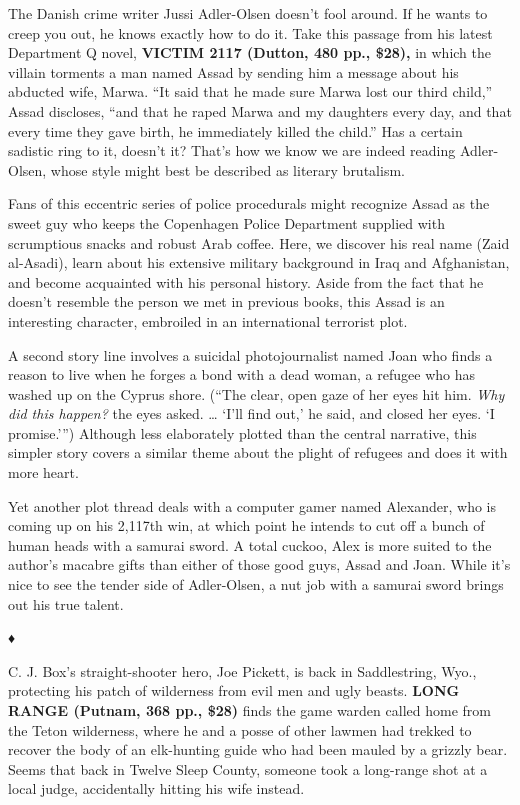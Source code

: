 The Danish crime writer Jussi Adler-Olsen doesn't fool around. If he
wants to creep you out, he knows exactly how to do it. Take this passage
from his latest Department Q novel, \textbf{VICTIM 2117 (Dutton, 480
pp., \$28),} in which the villain torments a man named Assad by sending
him a message about his abducted wife, Marwa. ``It said that he made
sure Marwa lost our third child,'' Assad discloses, ``and that he raped
Marwa and my daughters every day, and that every time they gave birth,
he immediately killed the child.'' Has a certain sadistic ring to it,
doesn't it? That's how we know we are indeed reading Adler-Olsen, whose
style might best be described as literary brutalism.

Fans of this eccentric series of police procedurals might recognize
Assad as the sweet guy who keeps the Copenhagen Police Department
supplied with scrumptious snacks and robust Arab coffee. Here, we
discover his real name (Zaid al-Asadi), learn about his extensive
military background in Iraq and Afghanistan, and become acquainted with
his personal history. Aside from the fact that he doesn't resemble the
person we met in previous books, this Assad is an interesting character,
embroiled in an international terrorist plot.

A second story line involves a suicidal photojournalist named Joan who
finds a reason to live when he forges a bond with a dead woman, a
refugee who has washed up on the Cyprus shore. (``The clear, open gaze
of her eyes hit him. \emph{Why did this happen?} the eyes asked.
\ldots{} `I'll find out,' he said, and closed her eyes. `I promise.''')
Although less elaborately plotted than the central narrative, this
simpler story covers a similar theme about the plight of refugees and
does it with more heart.

Yet another plot thread deals with a computer gamer named Alexander, who
is coming up on his 2,117th win, at which point he intends to cut off a
bunch of human heads with a samurai sword. A total cuckoo, Alex is more
suited to the author's macabre gifts than either of those good guys,
Assad and Joan. While it's nice to see the tender side of Adler-Olsen, a
nut job with a samurai sword brings out his true talent.

♦

C. J. Box's straight-shooter hero, Joe Pickett, is back in Saddlestring,
Wyo., protecting his patch of wilderness from evil men and ugly beasts.
\textbf{LONG RANGE (Putnam, 368 pp., \$28)} finds the game warden called
home from the Teton wilderness, where he and a posse of other lawmen had
trekked to recover the body of an elk-hunting guide who had been mauled
by a grizzly bear. Seems that back in Twelve Sleep County, someone took
a long-range shot at a local judge, accidentally hitting his wife
instead.

